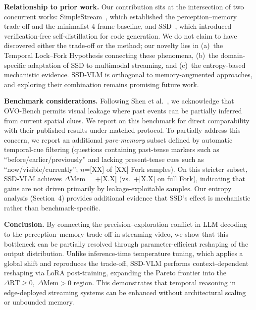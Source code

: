 \documentclass[11pt,a4paper]{article}
\begin{document}
\textbf{Relationship to prior work.} Our contribution sits at the intersection of two concurrent works: SimpleStream~\cite{simplestream}, which established the perception--memory trade-off and the minimalist 4-frame baseline, and SSD~\cite{ssd}, which introduced verification-free self-distillation for code generation. We do not claim to have discovered either the trade-off or the method; our novelty lies in (a)~the Temporal Lock--Fork Hypothesis connecting these phenomena, (b)~the domain-specific adaptation of SSD to multimodal streaming, and (c)~the entropy-based mechanistic evidence. SSD-VLM is orthogonal to memory-augmented approaches, and exploring their combination remains promising future work.

\textbf{Benchmark considerations.} Following Shen et al.~\cite{simplestream}, we acknowledge that OVO-Bench permits visual leakage where past events can be partially inferred from current spatial clues. We report on this benchmark for direct comparability with their published results under matched protocol. To partially address this concern, we report an additional \textit{pure-memory} subset defined by automatic temporal-cue filtering (questions containing past-tense markers such as ``before/earlier/previously'' and lacking present-tense cues such as ``now/visible/currently''; $n$=[XX] of [XX] Fork samples). On this stricter subset, SSD-VLM achieves $\Delta$Mem = +[X.X] (vs.\ +[X.X] on full Fork), indicating that gains are not driven primarily by leakage-exploitable samples. Our entropy analysis (Section~4) provides additional evidence that SSD's effect is mechanistic rather than benchmark-specific.

\textbf{Conclusion.} By connecting the precision--exploration conflict in LLM decoding to the perception--memory trade-off in streaming video, we show that this bottleneck can be partially resolved through parameter-efficient reshaping of the output distribution. Unlike inference-time temperature tuning, which applies a global shift and reproduces the trade-off, SSD-VLM performs context-dependent reshaping via LoRA post-training, expanding the Pareto frontier into the $\Delta\text{RT} \geq 0,\; \Delta\text{Mem} > 0$ region. This demonstrates that temporal reasoning in edge-deployed streaming systems can be enhanced without architectural scaling or unbounded memory.
\end{document}
